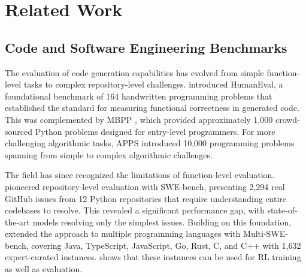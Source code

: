 \section{Related Work}

\subsection{Code and Software Engineering Benchmarks}

The evaluation of code generation capabilities has evolved from simple function-level tasks to complex repository-level challenges. \citet{chen2021evaluating} introduced HumanEval, a foundational benchmark of 164 handwritten programming problems that established the standard for measuring functional correctness in generated code. This was complemented by MBPP \citep{austin2021program}, which provided approximately 1,000 crowd-sourced Python problems designed for entry-level programmers. For more challenging algorithmic tasks, APPS \citep{hendrycks2021measuring} introduced 10,000 programming problems spanning from simple to complex algorithmic challenges.

The field has since recognized the limitations of function-level evaluation. \citet{jimenez2024swebench} pioneered repository-level evaluation with SWE-bench, presenting 2,294 real GitHub issues from 12 Python repositories that require understanding entire codebases to resolve. This revealed a significant performance gap, with state-of-the-art models resolving only the simplest issues. Building on this foundation, \citet{zan2024multiswe} extended the approach to multiple programming languages with Multi-SWE-bench, covering Java, TypeScript, JavaScript, Go, Rust, C, and C++ with 1,632 expert-curated instances. \citet{Da2025AgentRLVRTS} shows that these instances can be used for RL training as well as evaluation.


